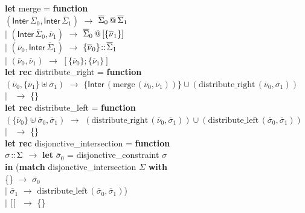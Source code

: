 
\noindent
\textbf{let} merge = \textbf{function} \\
\hspace*{1.2mm} $(\textsf{Inter} \, \overline\Sigma_0, \textsf{Inter} \, \overline\Sigma_1)$ $\rightarrow$ $\overline\Sigma_0 \, \text\sf{\small @} \, \overline\Sigma_1$ \\
$\mid$ $(\textsf{Inter} \, \overline\Sigma_0, \overline\nu_1)$ $\rightarrow$ $\overline\Sigma_0 \, \text\sf{\small @} \, [\{\overline\nu_1\}]$ \\
$\mid$ $(\overline\nu_0, \textsf{Inter} \, \overline\Sigma_1)$ $\rightarrow$ $\{\overline\nu_0\} \!::\! \overline\Sigma_1$ \\
$\mid$ $(\overline\nu_0, \overline\nu_1)$ $\rightarrow$ $[\{\overline\nu_0\}; \{\overline\nu_1\}]$ \\

\noindent 
\textbf{let rec} distribute\_right = \textbf{function} \\
\hspace*{1.2mm} $(\overline\nu_0, \{\overline\nu_1\} \uplus \overline\sigma_1)$ $\rightarrow$ $\{\textsf{Inter} \, (\textrm{merge} \, (\overline\nu_0, \overline\nu_1))\} \cup (\textrm{distribute\_right} \, (\overline\nu_0, \overline\sigma_1))$ \\
$\mid$ \wild \, $\rightarrow$ \{\} \\

\noindent
\textbf{let rec} distribute\_left = \textbf{function} \\
\hspace*{1.2mm} $(\{\overline\nu_0\} \uplus \overline\sigma_0, \overline\sigma_1)$ $\rightarrow$ $(\textrm{distribute\_right} \, (\overline\nu_0, \overline\sigma_1)) \cup (\textrm{distribute\_left} \, (\overline\sigma_0, \overline\sigma_1))$ \\
$\mid$ \wild \, $\rightarrow$ \{\} \\

\noindent
\textbf{let rec} disjonctive\_intersection  = \textbf{function} \\
\hspace*{1.2mm} $\sigma \!::\! \Sigma$ $\rightarrow$ \textbf{let} $\overline\sigma_0$ = disjonctive\_constraint  $\sigma$ \\
\hspace*{15mm} \textbf{in} (\textbf{match} disjonctive\_intersection  $\Sigma$ \textbf{with} \\
\hspace*{23mm} \{\} $\rightarrow$ $\overline\sigma_0$ \\
\hspace*{21mm} $\mid$ $\overline\sigma_1$ $\rightarrow$ $\textrm{distribute\_left} \, (\overline\sigma_0, \overline\sigma_1)$) \\
$\mid$ $\textrm{[\,]\,}$ $\rightarrow$ \{\} \\

